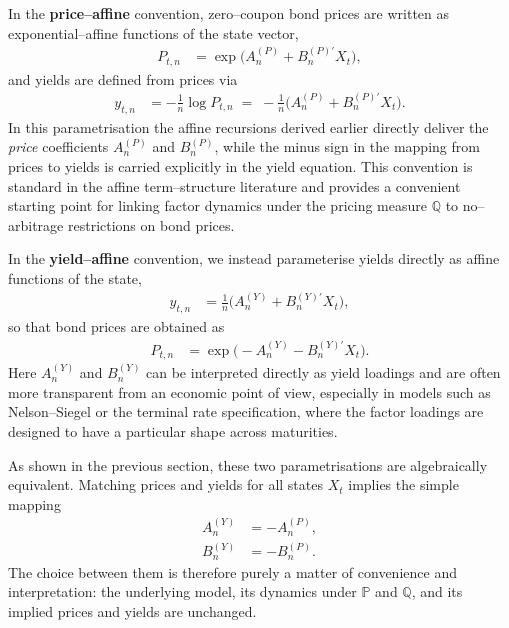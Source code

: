 \documentclass[
  letterpaper,
  DIV=11,
  numbers=noendperiod]{scrreprt}
\begin{document}
In the \textbf{price--affine} convention, zero--coupon bond prices are
written as exponential--affine functions of the state vector,
\begin{align}
P_{t,n} &= \exp\!\big( A_n^{(P)} + B_n^{(P)\prime} X_t \big),
\end{align}
and yields are defined from prices via
\begin{align}
y_{t,n}
&= - \frac{1}{n} \log P_{t,n}
 \;=\; -\frac{1}{n}\big( A_n^{(P)} + B_n^{(P)\prime} X_t \big).
\end{align}
In this parametrisation the affine recursions derived earlier directly
deliver the \emph{price} coefficients \(A_n^{(P)}\) and \(B_n^{(P)}\),
while the minus sign in the mapping from prices to yields is carried
explicitly in the yield equation. This convention is standard in the
affine term--structure literature and provides a convenient starting
point for linking factor dynamics under the pricing measure
\(\mathbb{Q}\) to no--arbitrage restrictions on bond prices.

In the \textbf{yield--affine} convention, we instead parameterise yields
directly as affine functions of the state,
\begin{align}
y_{t,n}
&= \frac{1}{n}\big( A_n^{(Y)} + B_n^{(Y)\prime} X_t \big),
\end{align}
so that bond prices are obtained as
\begin{align}
P_{t,n}
&= \exp\!\big( - A_n^{(Y)} - B_n^{(Y)\prime} X_t \big).
\end{align}
Here \(A_n^{(Y)}\) and \(B_n^{(Y)}\) can be interpreted directly as
yield loadings and are often more transparent from an economic point of
view, especially in models such as Nelson--Siegel or the terminal rate
specification, where the factor loadings are designed to have a
particular shape across maturities.

As shown in the previous section, these two parametrisations are
algebraically equivalent. Matching prices and yields for all states
\(X_t\) implies the simple mapping
\begin{align}
A_n^{(Y)} &= - A_n^{(P)}, \\
B_n^{(Y)} &= - B_n^{(P)}.
\end{align}
The choice between them is therefore purely a matter of convenience and
interpretation: the underlying model, its dynamics under \(\mathbb{P}\)
and \(\mathbb{Q}\), and its implied prices and yields are unchanged.
\end{document}
